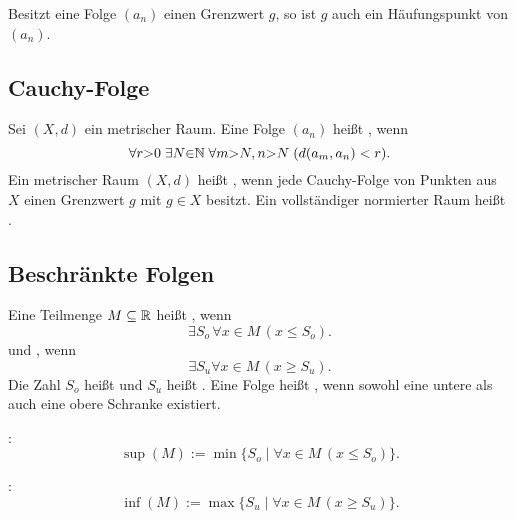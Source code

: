 Besitzt eine Folge $(a_n)$ einen Grenzwert $g$, so ist $g$ auch ein
Häufungspunkt von $(a_n)$.

\subsection{Cauchy-Folge}
\begin{definition}
Sei $(X,d)$ ein metrischer Raum.
Eine Folge $(a_n)$ heißt , wenn
\begin{equation}
\forall r{>}0\;\exists N{\in}\mathbb N\;\forall m{>}N,n{>}N\;
(d(a_m,a_n)<r).
\end{equation}
\noindent
Ein metrischer Raum $(X,d)$ heißt ,
wenn jede Cauchy-Folge von Punkten aus $X$ einen Grenzwert $g$
mit $g\in X$ besitzt. Ein vollständiger normierter Raum heißt
.
\end{definition}

\subsection{Beschränkte Folgen}
\begin{definition}
Eine Teilmenge $M\subseteq\mathbb R$ heißt ,
wenn
\begin{equation}\label{eq:Schranke-oben}
\exists S_o\,\forall x{\in}M\,(x\le S_o).
\end{equation}
und , wenn
\begin{equation}
\exists S_u\forall x{\in M}\,(x\ge S_u).
\end{equation}
Die Zahl $S_o$ heißt 
und $S_u$ heißt . Eine Folge heißt
, wenn sowohl eine untere als auch
eine obere Schranke existiert.
\end{definition}

\begin{definition}
:
\begin{equation}
\sup(M) := \min\{S_o\mid \forall x{\in}M\,(x\le S_o)\}.
\end{equation}

:
\begin{equation}\label{eq:Infimum}
\inf(M) := \max\{S_u\mid \forall x{\in}M\,(x\ge S_u)\}.
\end{equation}
\end{definition}

